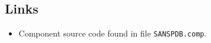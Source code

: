 \subsection*{Links}
\begin{itemize}
  \item Component source code found in file \texttt{SANSPDB.comp}.
\end{itemize}
